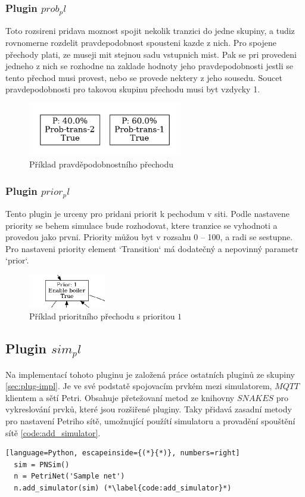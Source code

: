 \subsubsection{Plugin $prob_pl$}
\label{subsec:prob_pl}
Toto rozsireni pridava moznost spojit nekolik tranzici do jedne skupiny, a tudiz rovnomerne rozdelit pravdepodobnost spousteni kazde z nich. Pro spojene přechody plati, ze museji mit stejnou sadu vstupnich mist. Pak se pri provedeni jedneho z nich se rozhodne na zaklade hodnoty jeho pravdepodobnosti jestli se tento přechod musi provest, nebo se provede nektery z jeho sousedu. Soucet pravdepodobnosti pro takovou skupinu přechodu musi byt vzdycky 1.
\begin{figure}[hbt]
  \centering
  \includegraphics[width=0.6\textwidth]{obrazky-figures/prob-transition.png}
  \caption{Příklad pravděpodobnostního přechodu}
  \label{prob-transition}
\end{figure}

\subsubsection{Plugin $prior_pl$}
\label{subsec:prior_pl}
Tento plugin je urceny pro pridani priorit k pechodum v siti. Podle nastavene priority se behem simulace bude rozhodovat, ktere tranzice se vyhodnoti a provedou jako prvni. Priority můžou byt v rozsahu 0 -- 100, a radi se sestupne. Pro nastaveni priority element `Transition` má dodatečný a nepovinný parametr `prior`. 
\begin{figure}[hbt]
  \centering
  \includegraphics[width=0.3\textwidth]{obrazky-figures/prior-transition.png}
  \caption{Příklad prioritního přechodu s prioritou $1$}
  \label{prior-transition}
\end{figure}

\subsection{Plugin $sim_pl$}
\label{sec:aplikace-mqtt}
Na implementací tohoto pluginu je založená práce ostatních pluginů ze skupiny \ref{sec:plug-impl}. Je ve své podstatě spojovacím prvkém mezi simulatorem, $MQTT$ klientem a sětí Petri. Obsahuje přetežovaní metod ze knihovny $SNAKES$ pro vykreslování prvků, které jsou rozšiřené pluginy. Taky přidavá zasadní metody pro nastavení Petriho sítě, umožnující použítí simulatoru a provadění spouštění sítě \ref{code:add_simulator}.
\begin{lstlisting}[language=Python, escapeinside={(*}{*)}, numbers=right]
  sim = PNSim()
  n = PetriNet('Sample net')
  n.add_simulator(sim) (*\label{code:add_simulator}*)
\end{lstlisting}

